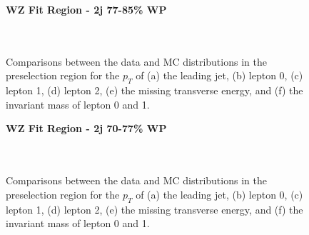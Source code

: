 \begin{figure}[h]
    \centering
    \textbf{WZ Fit Region - 2j 77-85\% WP}\\
    \\
    \\
    \caption{Comparisons between the data and MC distributions in the preselection region for the $p_T$ of (a) the leading jet, (b) lepton 0, (c) lepton 1, (d) lepton 2, (e) the missing transverse energy, and (f) the invariant mass of lepton 0 and 1.}
    \label{kin:WP_2j_77_85}
\end{figure}

\begin{figure}[h]
    \centering
    \textbf{WZ Fit Region - 2j 70-77\% WP}\\
    \\
    \\
    \caption{Comparisons between the data and MC distributions in the preselection region for the $p_T$ of (a) the leading jet, (b) lepton 0, (c) lepton 1, (d) lepton 2, (e) the missing transverse energy, and (f) the invariant mass of lepton 0 and 1.}
    \label{kin:WP_2j_70_77}
\end{figure}

